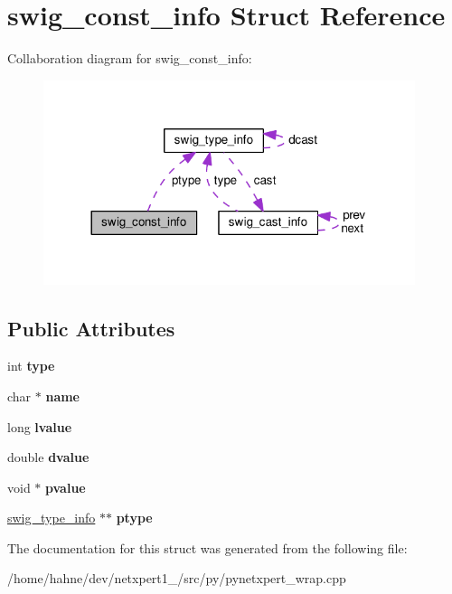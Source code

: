 \hypertarget{structswig__const__info}{}\section{swig\+\_\+const\+\_\+info Struct Reference}
\label{structswig__const__info}


Collaboration diagram for swig\+\_\+const\+\_\+info\+:\nopagebreak
\begin{figure}[H]
\begin{center}
\leavevmode
\includegraphics[width=308pt]{structswig__const__info__coll__graph}
\end{center}
\end{figure}
\subsection*{Public Attributes}
\begin{DoxyCompactItemize}
\item 
int {\bfseries type}\hypertarget{structswig__const__info_ae8bbc99e1cda11f24e306365cbf33893}{}\label{structswig__const__info_ae8bbc99e1cda11f24e306365cbf33893}

\item 
char $\ast$ {\bfseries name}\hypertarget{structswig__const__info_aad383d74116313cf9a8532e163368050}{}\label{structswig__const__info_aad383d74116313cf9a8532e163368050}

\item 
long {\bfseries lvalue}\hypertarget{structswig__const__info_af142e4c21ad4fe61f6c2624bff034583}{}\label{structswig__const__info_af142e4c21ad4fe61f6c2624bff034583}

\item 
double {\bfseries dvalue}\hypertarget{structswig__const__info_a74e477f1dbf515bcb7e2ef07a1d34c35}{}\label{structswig__const__info_a74e477f1dbf515bcb7e2ef07a1d34c35}

\item 
void $\ast$ {\bfseries pvalue}\hypertarget{structswig__const__info_abbc43512c364bff11fac5961c1155090}{}\label{structswig__const__info_abbc43512c364bff11fac5961c1155090}

\item 
\hyperlink{structswig__type__info}{swig\+\_\+type\+\_\+info} $\ast$$\ast$ {\bfseries ptype}\hypertarget{structswig__const__info_aedd46d173c5b5ed4ee60ad5660233557}{}\label{structswig__const__info_aedd46d173c5b5ed4ee60ad5660233557}

\end{DoxyCompactItemize}


The documentation for this struct was generated from the following file\+:\begin{DoxyCompactItemize}
\item 
/home/hahne/dev/netxpert1\+\_/src/py/pynetxpert\+\_\+wrap.\+cpp\end{DoxyCompactItemize}
